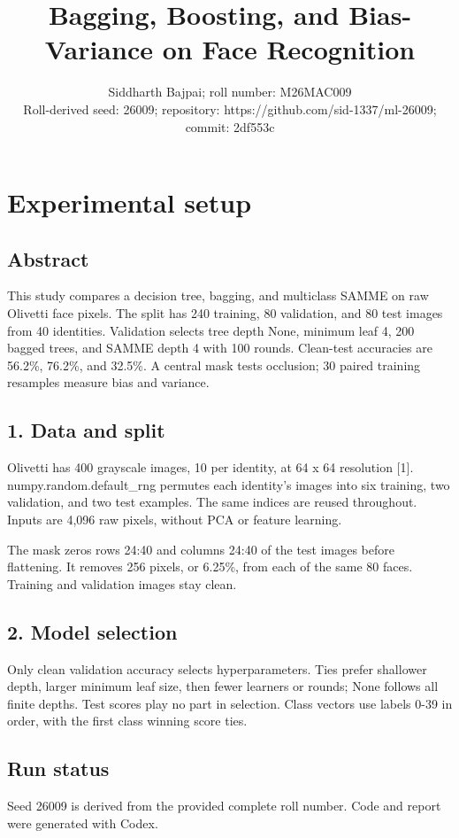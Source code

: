 \documentclass[10pt,twocolumn,letterpaper]{article}
\title{Bagging, Boosting, and Bias-Variance on Face Recognition}
\author{Siddharth Bajpai; roll number: M26MAC009\\Roll-derived seed: 26009; repository: https://github.com/sid-1337/ml-26009; commit: 2df553c}
\begin{document}
\maketitle
\section*{Experimental setup}
\subsection*{Abstract}
This study compares a decision tree, bagging, and multiclass SAMME on raw Olivetti face pixels. The split has 240 training, 80 validation, and 80 test images from 40 identities. Validation selects tree depth None, minimum leaf 4, 200 bagged trees, and SAMME depth 4 with 100 rounds. Clean-test accuracies are 56.2\%, 76.2\%, and 32.5\%. A central mask tests occlusion; 30 paired training resamples measure bias and variance.

\subsection*{1. Data and split}
Olivetti has 400 grayscale images, 10 per identity, at 64 x 64 resolution [1]. numpy.random.default\_rng permutes each identity's images into six training, two validation, and two test examples. The same indices are reused throughout. Inputs are 4,096 raw pixels, without PCA or feature learning.

The mask zeros rows 24:40 and columns 24:40 of the test images before flattening. It removes 256 pixels, or 6.25\%, from each of the same 80 faces. Training and validation images stay clean.

\subsection*{2. Model selection}
Only clean validation accuracy selects hyperparameters. Ties prefer shallower depth, larger minimum leaf size, then fewer learners or rounds; None follows all finite depths. Test scores play no part in selection. Class vectors use labels 0-39 in order, with the first class winning score ties.

\newpage
\subsection*{Run status}
Seed 26009 is derived from the provided complete roll number. Code and report were generated with Codex.
\end{document}
